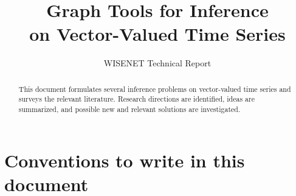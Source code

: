 \documentclass[11pt,final,onecolumn]{IEEEtran}
\begin{document}
\title{Graph Tools for Inference \\on Vector-Valued Time Series}
\author{WISENET Technical Report}




\maketitle
\begin{abstract}
This document formulates several inference problems on vector-valued
time series and surveys the relevant literature. Research directions
are identified, ideas are summarized, and possible new and relevant
solutions are investigated.
\end{abstract}







\section{Conventions to write in this document}
\end{document}
